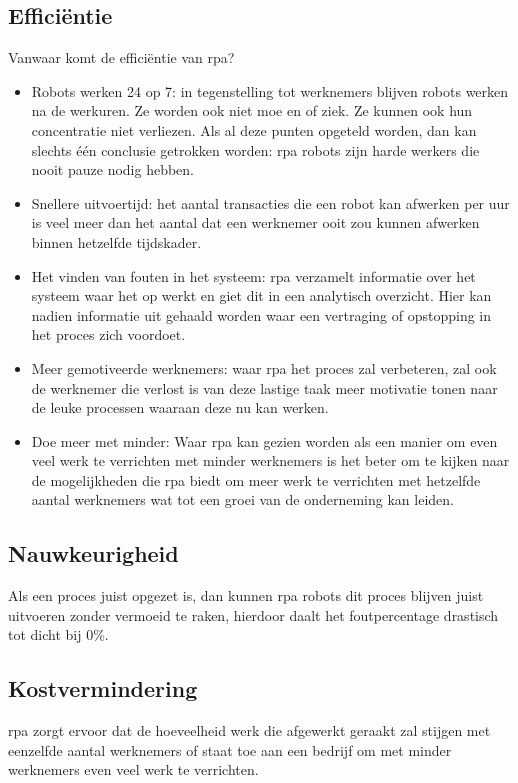 \subsection{Efficiëntie}
Vanwaar komt de efficiëntie van \acrshort{rpa}?
\begin{itemize}
	\item Robots werken 24 op 7: in tegenstelling tot werknemers blijven robots werken na de werkuren. Ze worden ook niet moe en of ziek. Ze kunnen ook hun concentratie niet verliezen. Als al deze punten opgeteld worden, dan kan slechts één conclusie getrokken worden: \acrshort{rpa} robots zijn harde werkers die nooit pauze nodig hebben.
	\item Snellere uitvoertijd: het aantal transacties die een robot kan afwerken per uur is veel meer dan het aantal dat een werknemer ooit zou kunnen afwerken binnen hetzelfde tijdskader.
	\item Het vinden van fouten in het systeem: \acrshort{rpa} verzamelt informatie over het systeem waar het op werkt en giet dit in een analytisch overzicht. Hier kan nadien informatie uit gehaald worden waar een vertraging of opstopping in het proces zich voordoet.
	\item Meer gemotiveerde werknemers: waar \acrshort{rpa} het proces zal verbeteren, zal ook de werknemer die verlost is van deze lastige taak meer motivatie tonen naar de leuke processen waaraan deze nu kan werken.
	\item Doe meer met minder: Waar \acrshort{rpa} kan gezien worden als een manier om even veel werk te verrichten met minder werknemers is het beter om te kijken naar de mogelijkheden die \acrshort{rpa} biedt om meer werk te verrichten met hetzelfde aantal werknemers wat tot een groei van de onderneming kan leiden.
\end{itemize}

\autocite{efficiencyRPA}
\subsection{Nauwkeurigheid}
Als een proces juist opgezet is, dan kunnen \acrshort{rpa} robots dit proces blijven juist uitvoeren zonder vermoeid te raken, hierdoor daalt het foutpercentage drastisch tot dicht bij 0\%. \autocite{efficiencyRPA}

\subsection{Kostvermindering}
\acrshort{rpa} zorgt ervoor dat de hoeveelheid werk die afgewerkt geraakt zal stijgen met eenzelfde aantal werknemers of staat toe aan een bedrijf om met minder werknemers even veel werk te verrichten. \autocite{efficiencyRPA}

